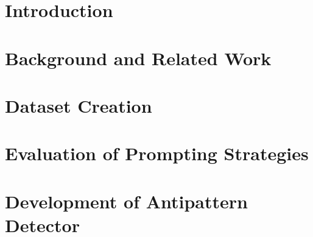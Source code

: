 

\chapter{Introduction}\label{chapter:introduction} %

\chapter{Background and Related Work}\label{chapter:background}


\chapter{Dataset Creation}\label{chapter:datasetCreation}


\chapter{Evaluation of Prompting Strategies}\label{chapter:promptingStrategies}


\chapter{Development of Antipattern Detector}\label{chapter:development}


